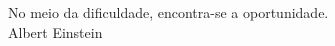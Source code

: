 \newpage %
\thispagestyle{empty} %
\clearpage %

\vfill %

\begin{flushright} %
    No meio da dificuldade, encontra-se a oportunidade. \\ Albert Einstein
\end{flushright}

\thispagestyle{empty} %
\clearpage %
